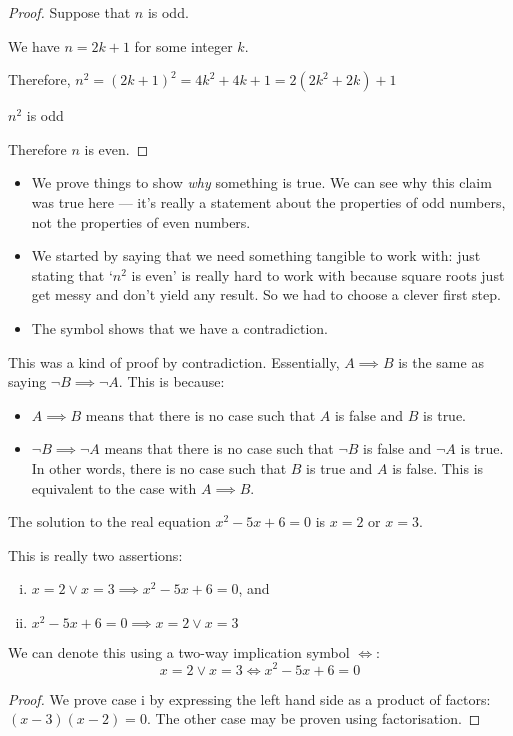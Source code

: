\begin{proof}
	Suppose that \(n\) is odd.

	We have \(n = 2k+1\) for some integer \(k\).

	Therefore, \(n^2 = (2k+1)^2 = 4k^2 + 4k + 1 = 2(2k^2 + 2k) + 1\)

	\(n^2\) is odd \contradiction{}

	Therefore \(n\) is even.
\end{proof}
\begin{itemize}
	\item We prove things to show \textit{why} something is true.
	      We can see why this claim was true here --- it's really a statement about the properties of odd numbers, not the properties of even numbers.
	\item We started by saying that we need something tangible to work with: just stating that `\(n^2\) is even' is really hard to work with because square roots just get messy and don't yield any result.
	      So we had to choose a clever first step.
	\item The symbol \contradiction{} shows that we have a contradiction.
\end{itemize}

This was a kind of proof by contradiction.
Essentially, \(A \implies B\) is the same as saying \(\neg B \implies \neg A\).
This is because:
\begin{itemize}
	\item \(A \implies B\) means that there is no case such that \(A\) is false and \(B\) is true.
	\item \(\neg B \implies \neg A\) means that there is no case such that \(\neg B\) is false and \(\neg A\) is true.
	      In other words, there is no case such that \(B\) is true and \(A\) is false.
	      This is equivalent to the case with \(A \implies B\).
\end{itemize}

\begin{claim}
	The solution to the real equation \(x^2-5x+6=0\) is \(x=2\) or \(x=3\).
\end{claim}
\begin{note}
	This is really two assertions:
	\begin{enumerate}[i.]
		\item \(x=2 \lor x=3 \implies x^2 - 5x + 6 = 0\), and
		\item \(x^2 - 5x + 6 = 0 \implies x=2 \lor x=3\)
	\end{enumerate}
	We can denote this using a two-way implication symbol \(\iff\):
	\[
		x=2 \lor x=3 \iff x^2 - 5x + 6 = 0
	\]
\end{note}
\begin{proof}
	We prove case i by expressing the left hand side as a product of factors: \((x-3)(x-2)=0\).
	The other case may be proven using factorisation.
\end{proof}

